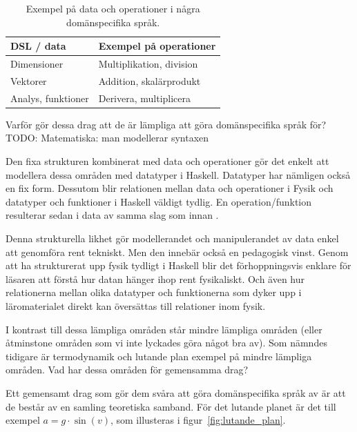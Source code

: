 \begin{binge}
\begin{table}[tph]
\centering
\caption{Exempel på data och operationer i några domänspecifika språk.}
\label{tab:data_och_ops}
\begin{tabular}{@{}l|l@{}}
\toprule
DSL / data & Exempel på operationer \\ \midrule
Dimensioner & Multiplikation, division \\
Vektorer & Addition, skalärprodukt \\
Analys, funktioner & Derivera, multiplicera \\ \bottomrule
\end{tabular}
\end{table}

Varför gör dessa drag att de är lämpliga att göra domänspecifika språk för?
TODO: Matematiska: man modellerar syntaxen

Den fixa strukturen kombinerat med data och operationer gör det enkelt att
modellera dessa områden med datatyper i Haskell. Datatyper har nämligen också en
fix form. Dessutom blir relationen mellan data och operationer i Fysik och
datatyper och funktioner i Haskell väldigt tydlig. En operation/funktion
resulterar sedan i data av samma slag som innan .

Denna strukturella likhet gör modellerandet och manipulerandet av data enkel att
genomföra rent tekniskt. Men den innebär också en pedagogisk vinst. Genom att ha
strukturerat upp fysik tydligt i Haskell blir det förhoppningsvis enklare för
läsaren att förstå hur datan hänger ihop rent fysikaliskt. Och även hur
relationerna mellan olika datatyper och funktionerna som dyker upp i
läromaterialet direkt kan översättas till relationer inom fysik.

I kontrast till dessa lämpliga områden står mindre lämpliga områden (eller
åtminstone områden som vi inte lyckades göra något bra av). Som nämndes tidigare
är termodynamik och lutande plan exempel på mindre lämpliga områden. Vad har
dessa områden för gemensamma drag?

Ett gemensamt drag som gör dem svåra att göra domänspecifika språk av är att de
består av en samling teoretiska samband. För det lutande planet är det till
exempel $a = g \cdot \sin(v)$, som illusteras i figur~\ref{fig:lutande_plan}.


\end{binge}
